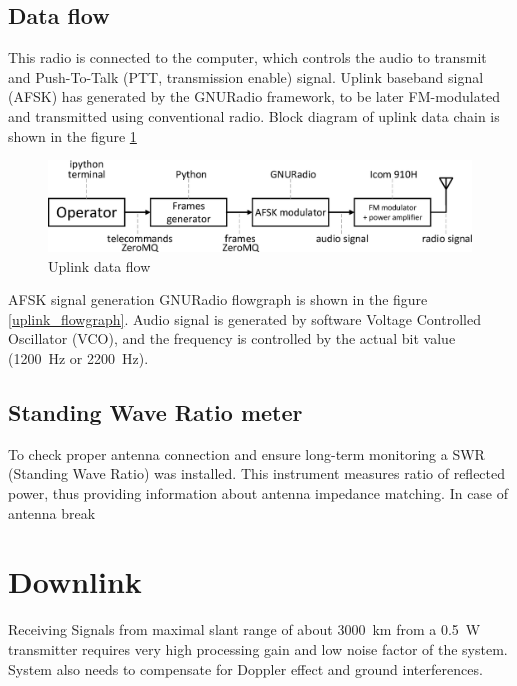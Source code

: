 \subsection{Data flow}
This radio is connected to the computer, which controls the audio to transmit and Push-To-Talk (PTT, transmission enable) signal. Uplink baseband signal (AFSK) has generated by the GNURadio framework, to be later FM-modulated and transmitted using conventional radio. Block diagram of uplink data chain is shown in the figure \ref{uplink_data_flow}

\begin{figure}[H]
    \centering
    \includegraphics[width=0.6\paperwidth]{img/3/uplink_data_flow.eps}
    \caption{Uplink data flow}
    \label{uplink_data_flow}
\end{figure}

AFSK signal generation GNURadio flowgraph is shown in the figure \ref{uplink_flowgraph}. Audio signal is generated by software Voltage Controlled Oscillator (VCO), and the frequency is controlled by the actual bit value (\SI{1200}{\hertz} or \SI{2200}{\hertz}).



\subsection{Standing Wave Ratio meter}
To check proper antenna connection and ensure long-term monitoring a SWR (Standing Wave Ratio) was installed. This instrument measures ratio of reflected power, thus providing information about antenna impedance matching. In case of antenna break





\section{Downlink}
Receiving Signals from maximal slant range of about \SI{3000}{\kilo\meter} from a \SI{0.5}{\watt} transmitter requires very high processing gain and low noise factor of the system. System also needs to compensate for Doppler effect and ground interferences.

